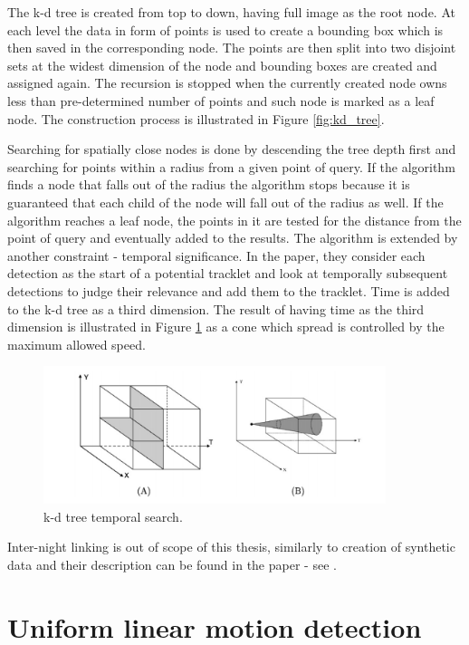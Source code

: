 	The k-d tree is created from top to down, having full image as the root node. At each level the data in form of points is used to create a bounding box which is then saved in the corresponding node. The points are then split into two disjoint sets at the widest dimension of the node and bounding boxes are created and assigned again. The recursion is stopped when the currently created node owns less than pre-determined number of points and such node is marked as a leaf node. The construction process is illustrated in Figure \ref{fig:kd_tree}.
	
	Searching for spatially close nodes is done by descending the tree depth first and searching for points within a radius from a given point of query. If the algorithm finds a node that falls out of the radius the algorithm stops because it is guaranteed that each child of the node will fall out of the radius as well. If the algorithm reaches a leaf node, the points in it are tested for the distance from the point of query and eventually added to the results. The algorithm is extended by another constraint - temporal significance. In the paper, they consider each detection as the start of a potential tracklet and look at temporally subsequent detections to judge their relevance and add them to the tracklet. Time is added to the k-d tree as a third dimension. The result of having time as the third dimension is illustrated in Figure \ref{fig:kd_tree_time} as a cone which spread is controlled by the maximum allowed speed.
	
	\begin{figure}[H]
	\centering
	  \includegraphics[width=10cm]{images/kd_tree_time}
		  \caption{k-d tree temporal search.}
	  \label{fig:kd_tree_time}
	\end{figure}
	
	Inter-night linking is out of scope of this thesis, similarly to creation of synthetic data and their description can be found in the paper - see \citep{}.

\section{Uniform linear motion detection}\label{sec:linear_motion}
	
